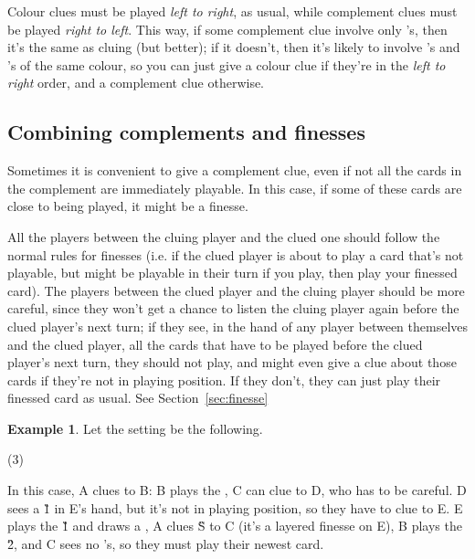 \documentclass[a4paper]{article}
\theoremstyle{plain}
\theoremstyle{definition}
\newtheorem{example}[theorem]{Example}
\begin{document}
Colour clues must be played \textit{left to right}, as usual, while complement clues must be played \textit{right to left}. This way, if some complement clue involve only 's, then it's the same as cluing  (but better); if it doesn't, then it's likely to involve 's and 's of the same colour, so you can just give a colour clue if they're in the \textit{left to right} order, and a complement clue otherwise.

\subsection{Combining complements and finesses}

Sometimes it is convenient to give a complement clue, even if not all the cards in the complement are immediately playable. In this case, if some of these cards are close to being played, it might be a finesse.

All the players between the cluing player and the clued one should follow the normal rules for finesses (i.e. if the clued player is about to play a card that's not playable, but might be playable in their turn if you play, then play your finessed card). The players between the clued player and the cluing player should be more careful, since they won't get a chance to listen the cluing player again before the clued player's next turn; if they see, in the hand of any player between themselves and the clued player, all the cards that have to be played before the clued player's next turn, they should not play, and might even give a clue about those cards if they're not in playing position. If they don't, they can just play their finessed card as usual. See Section~\ref{sec:finesse}

\begin{example}
	
	Let the setting be the following.
	
	\begin{tasks}(3)
		\task[+]      
		\task[A]    
		\task[B]    
		\task[C]    
		\task[D]    
		\task[E]    
	\end{tasks}
	
	In this case, A clues  to B: B plays the , C can clue  to D, who has to be careful. D sees a \G{1} in E's hand, but it's not in playing position, so they have to clue  to E. E plays the \G{1} and draws a , A clues \G{S} to C (it's a layered finesse on E), B plays the \G{2}, and C sees no 's, so they must play their newest card.
\end{example}
\end{document}
